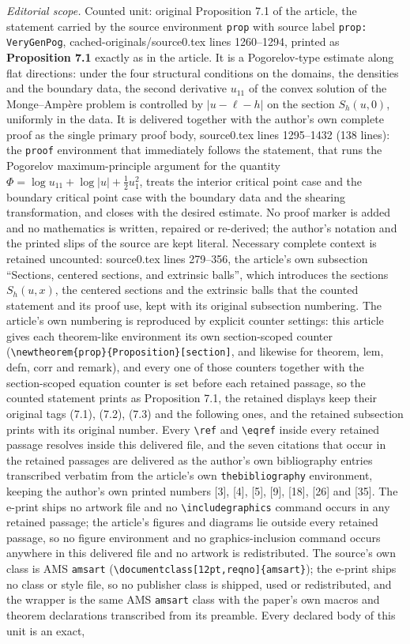 \documentclass[10pt,a4paper]{amsart}
\numberwithin{equation}{section}
\begin{document}
\noindent\textit{Editorial scope.} Counted unit: original Proposition 7.1 of the article, the statement carried by the source environment \texttt{prop} with source label \texttt{prop: VeryGenPog}, cached-originals/source0.tex lines 1260--1294, printed as \textbf{Proposition 7.1} exactly as in the article. It is a Pogorelov-type estimate along flat directions: under the four structural conditions on the domains, the densities and the boundary data, the second derivative $u_{11}$ of the convex solution of the Monge--Amp\`ere problem is controlled by $|u-\ell-h|$ on the section $S_h(u,0)$, uniformly in the data. It is delivered together with the author's own complete proof as the single primary proof body, source0.tex lines 1295--1432 (138 lines): the \texttt{proof} environment that immediately follows the statement, that runs the Pogorelov maximum-principle argument for the quantity $\Phi=\log u_{11}+\log|u|+\frac12 u_1^2$, treats the interior critical point case and the boundary critical point case with the boundary data and the shearing transformation, and closes with the desired estimate. No proof marker is added and no mathematics is written, repaired or re-derived; the author's notation and the printed slips of the source are kept literal. Necessary complete context is retained uncounted: source0.tex lines 279--356, the article's own subsection ``Sections, centered sections, and extrinsic balls'', which introduces the sections $S_h(u,x)$, the centered sections and the extrinsic balls that the counted statement and its proof use, kept with its original subsection numbering. The article's own numbering is reproduced by explicit counter settings: this article gives each theorem-like environment its own section-scoped counter (\texttt{\textbackslash newtheorem\{prop\}\{Proposition\}[section]}, and likewise for theorem, lem, defn, corr and remark), and every one of those counters together with the section-scoped equation counter is set before each retained passage, so the counted statement prints as Proposition 7.1, the retained displays keep their original tags (7.1), (7.2), (7.3) and the following ones, and the retained subsection prints with its original number. Every \texttt{\textbackslash ref} and \texttt{\textbackslash eqref} inside every retained passage resolves inside this delivered file, and the seven citations that occur in the retained passages are delivered as the author's own bibliography entries transcribed verbatim from the article's own \texttt{thebibliography} environment, keeping the author's own printed numbers [3], [4], [5], [9], [18], [26] and [35]. The e-print ships no artwork file and no \texttt{\textbackslash includegraphics} command occurs in any retained passage; the article's figures and diagrams lie outside every retained passage, so no figure environment and no graphics-inclusion command occurs anywhere in this delivered file and no artwork is redistributed. The source's own class is AMS \texttt{amsart} (\texttt{\textbackslash documentclass[12pt,reqno]\{amsart\}}); the e-print ships no class or style file, so no publisher class is shipped, used or redistributed, and the wrapper is the same AMS \texttt{amsart} class with the paper's own macros and theorem declarations transcribed from its preamble. Every declared body of this unit is an exact, 
\end{document}
